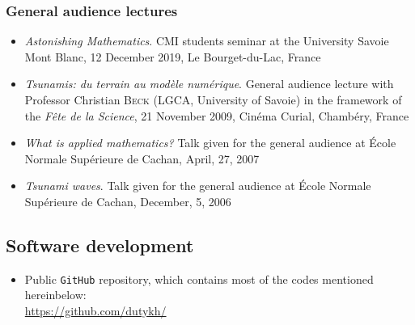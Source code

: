 \documentclass[final, a4paper, oneside, 12pt]{article}
\numberwithin{equation}{section}
\begin{document}
\subsubsection{General audience lectures}

\begin{itemize}

  \item \textit{Astonishing Mathematics}. CMI students seminar at the University Savoie Mont Blanc, 12 December 2019, Le Bourget-du-Lac, France

  \item \textit{Tsunamis: du terrain au mod\`ele num\'erique}. General audience lecture with Professor Christian \textsc{Beck} (LGCA, University of Savoie) in the framework of the \textit{F\^ete de la Science}, 21 November 2009, Cin\'ema Curial, Chamb\'ery, France

  \item \textit{What is applied mathematics?} Talk given for the general audience at \'Ecole Normale Sup\'erieure de Cachan, April, 27, 2007
  
  \item \textit{Tsunami waves}. Talk given for the general audience at \'Ecole Normale Sup\'erieure de Cachan, December, 5, 2006
  
\end{itemize}

\subsection{Software development}

\begin{itemize}
  \item Public \texttt{GitHub} repository, which contains most of the codes mentioned hereinbelow: \\
  \url{https://github.com/dutykh/}
\end{itemize}
\end{document}
